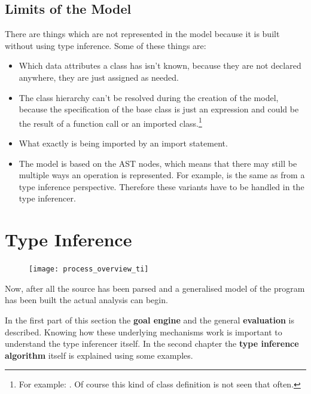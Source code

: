 \documentclass[12pt,halfparskip,DIV11,BCOR10mm]{scrreprt}
\begin{document}
\section{Limits of the Model}

There are things which are not represented in the model because it is built without using type inference. Some of these things are:

\begin{itemize}
    \item Which data attributes a class has isn't known, because they are not declared anywhere, they are just assigned as needed.
    \item The class hierarchy can't be resolved during the creation of the model, because the specification of the base class is just an expression and could be the result of a function call or an imported class.\footnote{
    For example: . Of course this kind of class definition is not seen that often.}
    \item What exactly is being imported by an import statement.
    \item The model is based on the AST nodes, which means that there may still be multiple ways an operation is represented. For example,  is the same as  from a type inference perspective. Therefore these variants have to be handled in the type inferencer.
\end{itemize}


\chapter{Type Inference}

\begin{figure}
    \vspace{-0.6cm}
    \texttt{[image: process\_overview\_ti]}
\end{figure}

Now, after all the source has been parsed and a generalised model of the program has been built the actual analysis can begin. 

In the first part of this section the \textbf{goal engine} and the general \textbf{evaluation} is described. Knowing how these underlying mechanisms work is important to understand the type inferencer itself. In the second chapter the \textbf{type inference algorithm} itself is explained using some examples. 
\end{document}
